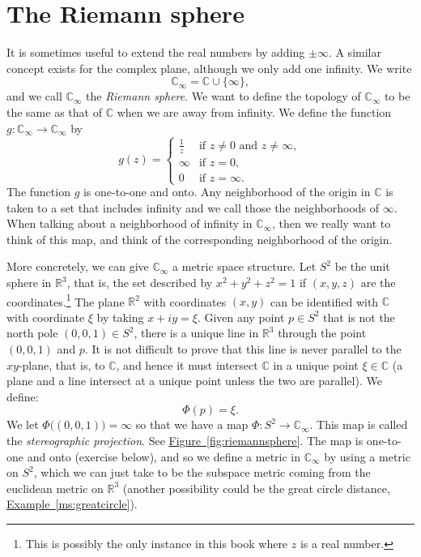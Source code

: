 \documentclass[12pt,openany]{book}
\newcommand{\C}{{\mathbb{C}}}
\newcommand{\R}{{\mathbb{R}}}
\newcommand{\myindex}[1]{#1\index{#1}}
\theoremstyle{plain}
\theoremstyle{remark}
\theoremstyle{definition}
\theoremstyle{exercise}
\theoremstyle{example}
\newcommand{\figureref}[1]{\hyperref[#1]{Figure~\ref*{#1}}}
\newcommand{\exampleref}[1]{\hyperref[#1]{Example~\ref*{#1}}}
\begin{document}

\section{The Riemann sphere}

It is sometimes useful to extend the real numbers by adding $\pm \infty$.
A similar concept exists for the complex plane, although
we only add one infinity.  We write
\begin{equation*}
\C_{\infty} = \C \cup \{ \infty \} ,
\end{equation*}
and we call $\C_{\infty}$ the \emph{\myindex{Riemann sphere}}.
We want to define the topology of $\C_\infty$ to be the same as that of $\C$
when we are away from infinity.
We define the function $g \colon \C_\infty \to \C_\infty$ by
\begin{equation*}
g(z) =
\begin{cases}
\frac{1}{z} & \text{if } z \not= 0 \text{ and } z \not= \infty, \\
\infty & \text{if } z = 0, \\
0 & \text{if } z = \infty.
\end{cases}
\end{equation*}
The function $g$ is one-to-one and onto.
Any neighborhood of the origin in $\C$ is taken to a set that
includes infinity and we call those the neighborhoods of
$\infty$.  When talking about a neighborhood of
infinity in $\C_{\infty}$, then we really want to think of this map,
and think of the corresponding neighborhood of the origin.

More concretely, we can give $\C_{\infty}$ a metric space structure.
Let $S^2$ be the unit sphere in $\R^3$,
that is, the set described by $x^2 + y^2 + z^2 = 1$ if $(x,y,z)$ are the
coordinates.\footnote{This is possibly the only instance in this book where
$z$ is a real number.}  The plane $\R^2$ with coordinates $(x,y)$ can be
identified with $\C$ with coordinate $\xi$ by taking $x+iy = \xi$.
Given any point $p \in S^2$ that is not the north pole $(0,0,1) \in S^2$,
there is a unique line in $\R^3$ through the point $(0,0,1)$ and $p$.
It is not difficult to prove that this line is never parallel to the
$xy$-plane, that is, to $\C$, and hence it must intersect $\C$ in a unique
point $\xi \in \C$ (a plane and a line intersect at a unique point unless
the two are parallel).  We define:
\begin{equation*}
\Phi(p) = \xi.
\end{equation*}
We let $\Phi\bigl((0,0,1)\bigr) = \infty$ so that we have a map
$\Phi \colon S^2 \to \C_\infty$.  This map is called the 
\emph{\myindex{stereographic projection}}.  See
\figureref{fig:riemannsphere}.
The map is one-to-one and onto (exercise below),
and so we define a metric in $\C_\infty$ by
using a metric on $S^2$, which we can just take to be the subspace
metric coming from the euclidean metric on $\R^3$ (another possibility
could be the great circle distance, \exampleref{ms:greatcircle}).
\end{document}
